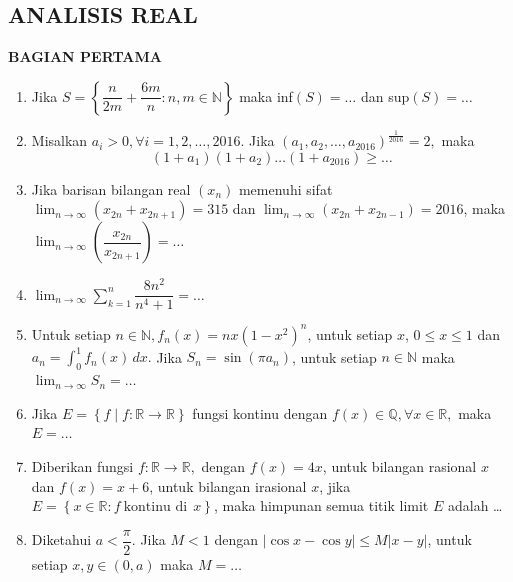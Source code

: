 \documentclass[12pt,twoside]{article}
\begin{document}
\subsection{ANALISIS REAL}
\textbf{BAGIAN PERTAMA}
\begin{enumerate}
	\item Jika $S = \left\lbrace \dfrac{n}{2m} + \dfrac{6m}{n} : n,m \in \mathbb{N} \right\rbrace$ maka inf$(S) =\dots$ dan sup$(S)=\dots$

	\item Misalkan $a_i >0, \forall i = 1,2,\dots,2016.$ Jika $(a_1,a_2,\dots,a_{2016})^{\frac{1}{2016}} = 2,$ maka
	      \begin{equation*}
		      (1+a_1)(1+a_2)\dots(1+a_{2016}) \geq\dots
	      \end{equation*}

	\item Jika barisan bilangan real $(x_n)$ memenuhi sifat $\displaystyle\lim_{n \to \infty}(x_{2n}+x_{2n+1}) = 315$ dan $\displaystyle\lim_{n \to \infty}(x_{2n}+x_{2n-1}) = 2016$, maka $\displaystyle\lim_{n \to \infty}\left(\dfrac{x_{2n}}{x_{2n+1}}\right) = \dots$

	\item $\displaystyle\lim_{n \to \infty} \sum_{k=1}^{n} \dfrac{8n^2}{n^4+1} =\dots$

	\item Untuk setiap $n \in \mathbb{N}, f_n(x) = nx(1-x^2)^n$, untuk setiap $x$, $0 \leq x \leq 1$ dan $a_n = \displaystyle\int_{0}^{1} f_n(x)\,dx.$ Jika $S_n = \sin(\pi a_n)$, untuk setiap $n \in \mathbb{N}$ maka $\displaystyle \lim_{n \to \infty} S_n = \dots$

	\item Jika $E = \left\lbrace f \mid f : \mathbb{R} \to \mathbb{R} \right\rbrace $ fungsi kontinu dengan $f(x) \in \mathbb{Q}, \forall x \in \mathbb{R},  $ maka $E = \dots$

	\item Diberikan fungsi $f : \mathbb{R} \to \mathbb{R},$ dengan $f(x) =4x$, untuk bilangan rasional $x$ dan $f(x)= x+6$, untuk bilangan irasional $x$, jika $E = \left\lbrace x \in \mathbb{R} : f ~ \text{kontinu di} ~  ~ x \right\rbrace $, maka himpunan semua titik limit $E$ adalah \dots

	\item Diketahui $a < \dfrac{\pi}{2}$. Jika $M<1$ dengan $|\cos x - \cos y| \leq M|x-y| $, untuk setiap $x,y \in (0,a)$ maka $M = \dots$
\end{enumerate}
\end{document}
